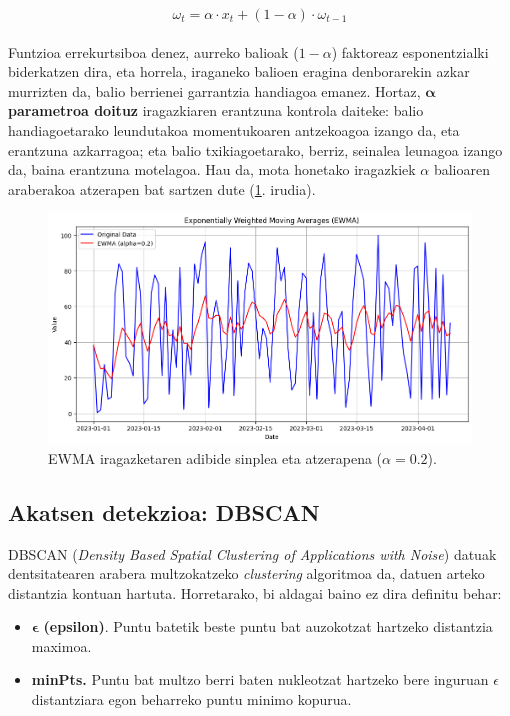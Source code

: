 \documentclass[12pt]{article}
\numberwithin{figure}{section}
\numberwithin{equation}{section}
\begin{document}
\begin{equation}
    \omega_t = \alpha \cdot x_t + (1-\alpha) \cdot \omega_{t-1}
\end{equation}\\

Funtzioa errekurtsiboa denez, aurreko balioak ($1-\alpha$) faktoreaz esponentzialki biderkatzen dira, eta horrela, iraganeko balioen eragina denborarekin azkar murrizten da, balio berrienei garrantzia handiagoa emanez. Hortaz, \textbf{$\mathbf{\alpha}$ parametroa doituz} iragazkiaren erantzuna kontrola daiteke: balio handiagoetarako leundutakoa momentukoaren antzekoagoa izango da, eta erantzuna azkarragoa; eta balio txikiagoetarako, berriz, seinalea leunagoa izango da, baina erantzuna motelagoa. Hau da, mota honetako iragazkiek $\alpha$ balioaren araberakoa atzerapen bat sartzen dute (\ref{fig:ewma_example}. irudia).\\

\begin{figure}[h]
    \centering
    \includegraphics[width=0.9\linewidth]{4 - Detekzio teknikak/ewma_example.png}
    \caption{EWMA iragazketaren adibide sinplea eta atzerapena ($\alpha = 0.2$).}
    \label{fig:ewma_example}
\end{figure}

\subsection{Akatsen detekzioa: DBSCAN}
\label{sec:dbscan}
DBSCAN (\textit{Density Based Spatial Clustering of Applications with Noise}) \cite{ester_density-based_1996} datuak dentsitatearen arabera multzokatzeko \textit{clustering} algoritmoa da, datuen arteko distantzia kontuan hartuta. Horretarako, bi aldagai baino ez dira definitu behar:

\begin{itemize}
    \item $\mathbf{\epsilon}$ \textbf{(epsilon)}. Puntu batetik beste puntu bat auzokotzat hartzeko distantzia maximoa.
    \item \textbf{minPts.} Puntu bat multzo berri baten nukleotzat hartzeko bere inguruan $\epsilon$ distantziara egon beharreko puntu minimo kopurua.
\end{itemize}
\end{document}

